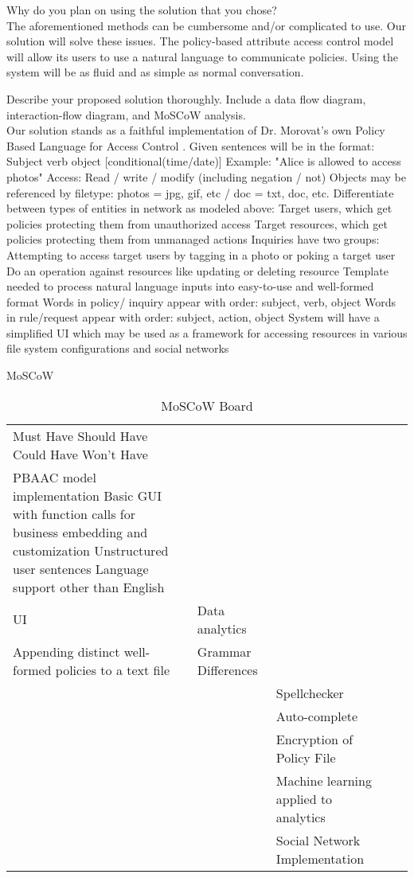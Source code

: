 \documentclass[12pt]{article}
\begin{document}
Why do you plan on using the solution that you chose? \\
The aforementioned methods can be cumbersome and/or complicated to use. Our solution will solve these issues. The policy-based attribute access control model will allow its users to use a natural language to communicate policies. Using the system will be as fluid and as simple as normal conversation. 

Describe your proposed solution thoroughly. Include a data flow diagram, interaction-flow diagram, and MoSCoW analysis. \\
Our solution stands as a faithful implementation of Dr. Morovat's own Policy Based Language for Access Control \cite{morovat16}.
Given sentences will be in the format: Subject verb object [conditional(time/date)]
Example: "Alice is allowed to access photos"
Access: Read / write / modify (including negation / not)
Objects may be referenced by filetype: photos = jpg, gif, etc / doc = txt, doc, etc.
Differentiate between types of entities in network as modeled above:
Target users, which get policies protecting them from unauthorized access
Target resources, which get policies protecting them from unmanaged actions
Inquiries have two groups:
Attempting to access target users by tagging in a photo or poking a target user
Do an operation against resources like updating or deleting resource
Template needed to process natural language inputs into easy-to-use and well-formed format
Words in policy/ inquiry appear with order: subject, verb, object
Words in rule/request appear with order: subject, action, object
System will have a simplified UI which may be used as a framework for accessing resources in various file system configurations and social networks

MoSCoW \\
\begin{table}[]
\caption{MoSCoW Board}
\begin{tabular}{lllll}
 Must Have  Should Have  Could Have  Won't Have  \\
 PBAAC model implementation  Basic GUI with function calls for business embedding and customization  Unstructured user sentences  Language support other than English  \\
 UI  &  Data analytics  & \\
 Appending distinct well-formed policies to a text file  &  Grammar Differences  & \\
 &  &   Spellchecker   & \\
 &  &   Auto-complete   & \\
 &  &   Encryption of Policy File   & \\
 &  &   Machine learning applied to analytics   & \\
 &  &   Social Network Implementation   & \\
\end{tabular}
\end{table}
\end{document}
